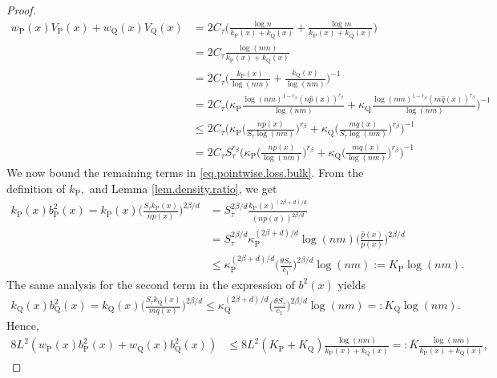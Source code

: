 \documentclass[10pt]{article}
\renewcommand{\P}{\operatorname{P}}
\newcommand{\Q}{\operatorname{Q}}
\renewcommand{\k}{\kappa}
\newcommand{\wh}{\widehat}
\newcommand{\ol}{\overline}
\begin{document}
\begin{proof}
    \begin{align}
        \label{eq.two.sample.local.variance.bound}
        w_{\P}(x)V_{\P}(x) + w_{\Q}(x)V_{\Q}(x) &= 2C_\tau\Big(\frac{\log n}{k_{\P}(x) + k_{\Q}(x)} + \frac{\log m}{k_{\P}(x) + k_{\Q}(x)}\Big)\nonumber\\
        &= 2C_\tau\frac{\log (nm)}{k_{\P}(x) + k_{\Q}(x)}\\
        & = 2C_\tau \Big(\frac{k_{\P}(x)}{\log (nm)} + \frac{k_{\Q}(x)}{\log (nm)}\Big)^{-1}\nonumber\\
        &= 2C_\tau \Bigg(\k_{\P}\frac{\log(nm)^{1 - r_\beta}(n\wh p(x))^{r_\beta}}{\log(nm)} + \k_{\Q}\frac{\log(nm)^{1 - r_\beta}(m\wh q(x))^{r_\beta}}{\log(nm)}\Bigg)^{-1}\nonumber\\
        &\leq 2C_\tau \Bigg(\k_{\P}\bigg(\frac{np(x)}{S_\tau\log(nm)}\bigg)^{r_\beta} + \k_{\Q}\bigg(\frac{m q(x)}{S_\tau \log(nm)}\bigg)^{r_\beta}\Bigg)^{-1}\nonumber\\
        &= 2C_\tau S_\tau^{r_\beta} \Bigg(\k_{\P}\bigg(\frac{np(x)}{\log(nm)}\bigg)^{r_\beta} + \k_{\Q}\bigg(\frac{m q(x)}{\log(nm)}\bigg)^{r_\beta}\Bigg)^{-1}
    \end{align}
    We now bound the remaining terms in \eqref{eq.pointwise.loss.bulk}. From the definition of $k_{\P},$ and Lemma \ref{lem.density.ratio}, we get
    \begin{align*}
        k_{\P}(x)b_{\P}^2(x) = k_{\P}(x)\bigg(\frac{S_\tau k_{\P}(x)}{np(x)}\bigg)^{2\beta/d} &= S_\tau^{2\beta/d}\frac{k_{\P}(x)^{(2\beta + d)/d}}{(np(x))^{2\beta/d}}\\
        &=S_\tau^{2\beta/d}\k_{\P}^{(2\beta + d)/d}\log(nm)\bigg(\frac{\wh p(x)}{p(x)}\bigg)^{2\beta/d}\\
        &\leq \k_{\P}^{(2\beta + d)/d}\bigg(\frac{\theta S_\tau}{c_1}\bigg)^{2\beta/d}\log(nm) := K_{\P}\log(nm).
    \end{align*}
    The same analysis for the second term in the expression of $b^2(x)$ yields
    \begin{align*}
        k_{\Q}(x)b_{\Q}^2(x) = k_{\Q}(x)\bigg(\frac{S_\tau k_{\Q}(x)}{mq(x)}\bigg)^{2\beta/d} \leq \k_{\Q}^{(2\beta + d)/d}\bigg(\frac{\theta S_\tau}{c_1}\bigg)^{2\beta/d}\log(nm) =: K_{\Q}\log(nm).
    \end{align*}
    Hence,
    \begin{align*}
        8L^2(w_{\P}(x)b^2_{\P}(x) + w_{\Q}(x)b^2_{\Q}(x)) &\leq 8L^2(K_{\P} + K_{\Q})\frac{\log(nm)}{k_{\P}(x) + k_{\Q}(x)} =: \ol K\frac{\log(nm)}{k_{\P}(x) + k_{\Q}(x)},
    \end{align*}

\end{proof}
\end{document}
